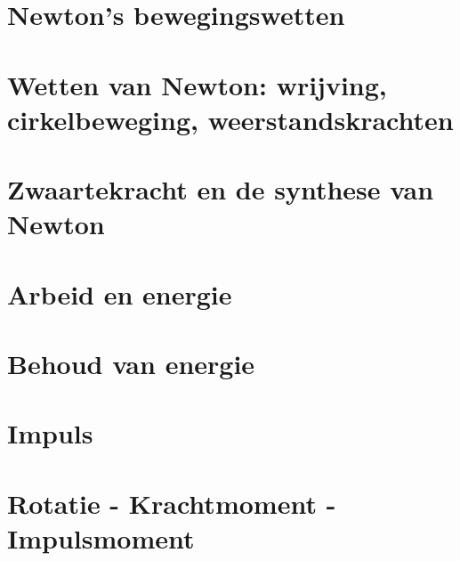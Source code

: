 \section{Newton's bewegingswetten}

\vspace{0.5cm}



\newpage

\section{Wetten van Newton: wrijving, cirkelbeweging, weerstandskrachten}

\vspace{0.5cm}



\newpage

\section{Zwaartekracht en de synthese van Newton}

\vspace{0.5cm}



\newpage

\section{Arbeid en energie}

\vspace{0.5cm}



\newpage

\section{Behoud van energie}

\vspace{0.5cm}



\newpage

\section{Impuls}

\vspace{0.5cm}



\newpage

\section{Rotatie - Krachtmoment - Impulsmoment}

\vspace{0.5cm}


